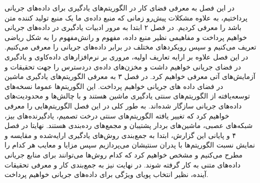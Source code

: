 در این فصل به معرفی فضای کار در الگوریتم‌های یادگیری برای داده‌های جریانی پرداختیم، به علاوه مشکلات پیش‌رو زمانی که منبع داده‌ی ما یک منبع تولید کننده متن باشد را معرفی کردیم. در فصل‌ ۲ ابتدا به مرور ادبیات یادگیری در داده‌های جریانی خواهیم پرداخت و مفاهیمی نظیر منبع داده‌، مفهوم و رانش‌مفهوم را به شکل ریاضی تعریف می‌کنیم و سپس رویکردهای مختلف در برابر داده‌های جریانی را معرفی می‌کنیم. در این فصل علاوه بر ارایه تعاریف اولیه، مروری بر نرم‌افزارهای داده‌کاوی و یادگیری در فضای جریانی خواهیم داشت و مخزن‌های داده‌ی دردسترس را جهت تحقیقات و آزمایش‌های آتی معرفی خواهیم کرد. در فصل ۳ به معرفی الگوریتم‌های یادگیری ماشین در فضای داده های جریانی خواهیم پرداخت. این الگوریتم‌ها عموما نسخه‌های توسعه‌یافته از الگوریتم‌های سنتی یادگیری ماشین‌ هستند و با چالش‌ها و محدودیت‌های داده‌های جریانی سازگار شده‌اند. به طور کلی در این فصل الگوریتم‌هایی را معرفی خواهیم کرد که تغییر یافته الگوریتم‌های سنتی درخت تصمیم، یادگیرنده‌های بیز، شبکه‌های عصبی، ماشین‌های بردار پشتیبان و مجمع‌های رده‌بندی هستند. نهایتا در فصل ۴ و پایانی این گزارش، ابتدا به جمع‌بندی روش‌های یادگیری ارایه‌شده و مقایسه و نمایش نسبت الگوریتم‌ها با پدران سنتیشان می‌پردازیم سپس مزایا و معایب هر کدام را مطرح می‌کنیم و مشخص خواهیم کرد که کدام روش‌ها می‌توانند برای منابع جریانی داده‌های متنی به کار گرفته شوند. در نهایت نیز به جمع‌بندی کار و معرفی تحقیقات آینده،‌ نظیر انتخاب پویای ویژگی برای داده‌های جریانی خواهیم پرداخت.

